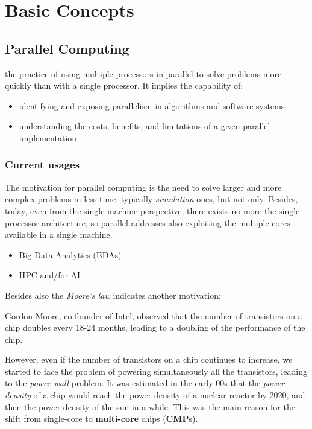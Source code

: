 \chapter{Basic Concepts}
\label{ch:01/basic-concepts}


\section{Parallel Computing}
\begin{definition}
   the practice of using multiple processors in parallel to solve problems more quickly than with a single processor. It implies the capability of:
   \begin{itemize}
      \item
      identifying and exposing parallelism in algorithms and software systems
      \item
      understanding the costs, benefits, and limitations of a given parallel implementation
   \end{itemize}
\end{definition}

\subsection{Current usages}
The motivation for parallel computing is the need to solve larger and more complex problems in less time, typically \textit{simulation} ones, but not only.
Besides, today, even from the single machine perspective, there exists no more the single processor architecture, so parallel addresses also exploiting the multiple cores available in a single machine.

\begin{itemize}
   \item Big Data Analytics (BDAs)
   \item HPC and/for AI
\end{itemize}

Besides also the \textit{Moore's law} indicates another motivation:
\begin{definition}
   Gordon Moore, co-founder of Intel, observed that the number of transistors on a chip doubles\textbf{} every 18-24 months, leading to a doubling of the performance of the chip.
\end{definition}
However, even if the number of transistors on a chip continues to increase, we started to face the problem of powering simultaneously all the transistors, leading to the \textit{power wall} problem.
It was estimated in the early 00s that the \textit{power density} of a chip would reach the power density of a nuclear reactor by 2020, and then the power density of the sun in a while.
This was the main reason for the shift from single-core to \textbf{multi-core} chips (\textbf{CMP}s).

